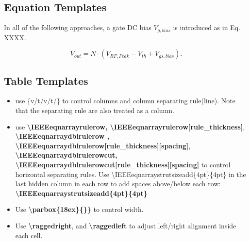 \documentclass[rfvlsi_template_jrnl.tex]{subfiles}
\begin{document}
\subsection{Equation Templates }

In all of the following approaches, a gate DC bias $V_{g,bias}$ is introduced as in Eq. XXXX.

\begin{equation}
\label{NStageRectVout}
V_{out}=N⋅(V_{RF,Peak}-V_{th}+V_{gs,bias}).
\end{equation}

\subsection{Table Templates}
\begin{itemize}
	\item use \{v/t/v/t/\} to control columns and column separating rule(line). Note that the separating rule are also treated as a column. 
	\item use \newline  \textbf{ \textbackslash IEEEeqnarrayrulerow, \textbackslash IEEEeqnarrayrulerow[rule\_thickness]}, \textbf{ \textbackslash IEEEeqnarraydblrulerow , \textbackslash IEEEeqnarraydblrulerow[rule\_thickness][spacing]}, \textbf{ \textbackslash IEEEeqnarraydblrulerowcut, \textbackslash IEEEeqnarraydblrulerowcut[rule\_thickness][spacing]} to control horizontal separating rules. Use \textbackslash IEEEeqnarraystrutsizeadd\{4pt\}\{4pt\} in the last hidden column in each row to add spaces above/below each row:  \textbf{\textbackslash IEEEeqnarraystrutsizeadd\{4pt\}\{4pt\}}
	\item Use \textbf{\textbackslash parbox\{18ex\}\{\}\}} to control width.
	\item Use \textbf{\textbackslash raggedright}, and \textbf{\textbackslash raggedleft} to adjust left/right alignment inside each cell.
\end{itemize}
\end{document}
